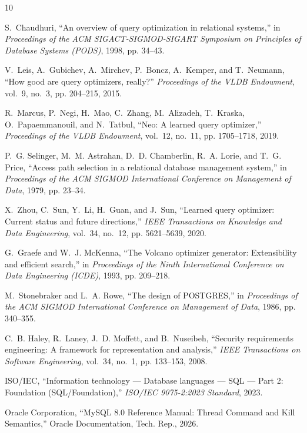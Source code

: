 \documentclass[conference]{IEEEtran}
\begin{document}

\begin{thebibliography}{10}

S.~Chaudhuri, ``An overview of query optimization in relational systems,'' in \emph{Proceedings of the ACM SIGACT-SIGMOD-SIGART Symposium on Principles of Database Systems (PODS)}, 1998, pp. 34--43.

V.~Leis, A.~Gubichev, A.~Mirchev, P.~Boncz, A.~Kemper, and T.~Neumann, ``How good are query optimizers, really?'' \emph{Proceedings of the VLDB Endowment}, vol.~9, no.~3, pp. 204--215, 2015.

R.~Marcus, P.~Negi, H.~Mao, C.~Zhang, M.~Alizadeh, T.~Kraska, O.~Papaemmanouil, and N.~Tatbul, ``Neo: A learned query optimizer,'' \emph{Proceedings of the VLDB Endowment}, vol.~12, no.~11, pp. 1705--1718, 2019.

P.~G. Selinger, M.~M. Astrahan, D.~D. Chamberlin, R.~A. Lorie, and T.~G. Price, ``Access path selection in a relational database management system,'' in \emph{Proceedings of the ACM SIGMOD International Conference on Management of Data}, 1979, pp. 23--34.

X.~Zhou, C.~Sun, Y.~Li, H.~Guan, and J.~Sun, ``Learned query optimizer: Current status and future directions,'' \emph{IEEE Transactions on Knowledge and Data Engineering}, vol.~34, no.~12, pp. 5621--5639, 2020.

G.~Graefe and W.~J. McKenna, ``The Volcano optimizer generator: Extensibility and efficient search,'' in \emph{Proceedings of the Ninth International Conference on Data Engineering (ICDE)}, 1993, pp. 209--218.

M.~Stonebraker and L.~A. Rowe, ``The design of POSTGRES,'' in \emph{Proceedings of the ACM SIGMOD International Conference on Management of Data}, 1986, pp. 340--355.

C.~B. Haley, R.~Laney, J.~D. Moffett, and B.~Nuseibeh, ``Security requirements engineering: A framework for representation and analysis,'' \emph{IEEE Transactions on Software Engineering}, vol.~34, no.~1, pp. 133--153, 2008.

ISO/IEC, ``Information technology --- Database languages --- SQL --- Part 2: Foundation (SQL/Foundation),'' \emph{ISO/IEC 9075-2:2023 Standard}, 2023.

Oracle Corporation, ``MySQL 8.0 Reference Manual: Thread Command and Kill Semantics,'' Oracle Documentation, Tech. Rep., 2026.

\end{thebibliography}
\end{document}
